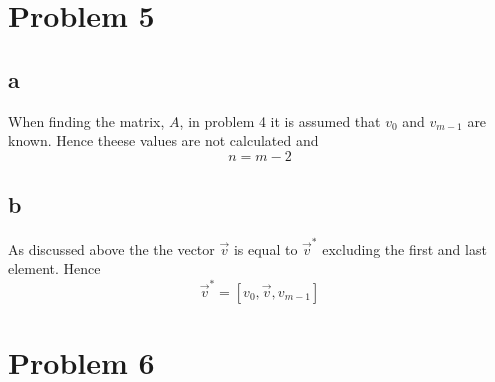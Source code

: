 \documentclass[english,notitlepage]{revtex4-1}  %
\begin{document}
\section*{Problem 5}
    \subsection*{a}
        \label{sec:oppgave5a}
        When finding the matrix, $A$, in problem 4 it is assumed that $v_0$ and $v_{m - 1}$ are known.
        Hence theese values are not calculated and
        \begin{equation*}
                n
            =   m - 2
        \end{equation*}
    
    \subsection*{b}
        \label{sec:5b}
        As discussed above the the vector $\vec{v}$ is equal to $\vec{v}^*$ excluding the first and last element.
        Hence
        \begin{equation}
            \vec{v}^* = \left[v_0, \vec{v}, v_{m - 1} \right]
        \end{equation}


\section*{Problem 6}
\end{document}
